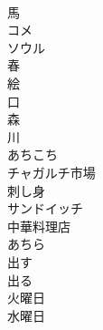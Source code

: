 \documentclass[8pt]{extreport}
\begin{document}
\begin{CJK}{UTF8}{min}
\\	馬
\\	コメ
\\	ソウル
\\	春
\\	絵
\\	口
\\	森
\\	川
\\	あちこち
\\	チャガルチ市場
\\	刺し身
\\	サンドイッチ
\\	中華料理店
\\	あちら
\\	出す
\\	出る
\\	火曜日
\\	水曜日
\end{CJK}
\end{document}
